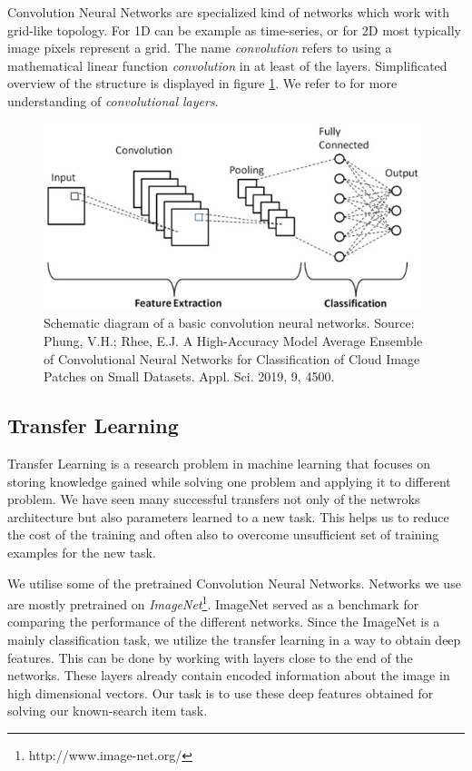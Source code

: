 Convolution Neural Networks are specialized kind of networks which work with grid-like topology. For 1D can be example as time-series, or for 2D most typically image pixels represent a grid. The name \emph{convolution} refers to using a mathematical linear function \emph{convolution} in at least of the layers. Simplificated overview of the structure is displayed in figure \ref{fig:convolution_neural_network}. We refer to \cite{Goodfellow-et-al-2016} for more understanding of \emph{convolutional layers}.

\begin{figure}
    \centering
    \includegraphics[width=0.98\textwidth]{img/convolution_neural_network.jpg}
    \caption{Schematic diagram of a basic convolution neural networks. Source: Phung, V.H.; Rhee, E.J. A High-Accuracy Model Average Ensemble of Convolutional Neural Networks for Classification of Cloud Image Patches on Small Datasets. Appl. Sci. 2019, 9, 4500.}
    \label{fig:convolution_neural_network}
\end{figure}

\subsection{Transfer Learning}

Transfer Learning is a research problem in machine learning that focuses on storing knowledge gained while solving one problem and applying it to different problem. We have seen many successful transfers not only of the netwroks architecture but also parameters learned to a new task. This helps us to reduce the cost of the training and often also to overcome unsufficient set of training examples for the new task.

We utilise some of the pretrained Convolution Neural Networks. Networks we use are mostly pretrained on \emph{ImageNet}\footnote{http://www.image-net.org/}. ImageNet served as a benchmark for comparing the performance of the different networks. Since the ImageNet is a mainly classification task, we utilize the transfer learning in a way to obtain deep features. This can be done by working with layers close to the end of the networks. These layers already contain encoded information about the image in high dimensional vectors. Our task is to use these deep features obtained for solving our known-search item task.


